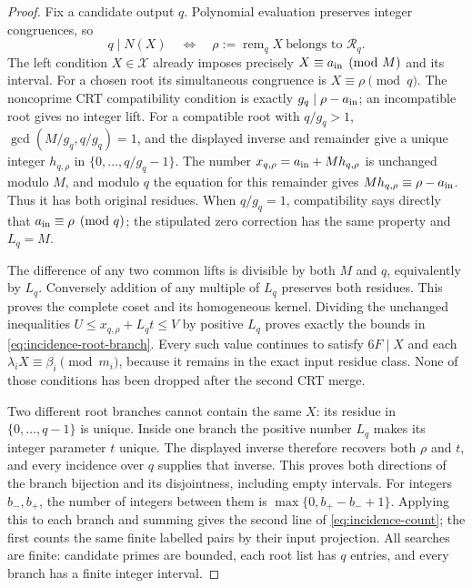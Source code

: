\begin{proof}
Fix a candidate output \(q\).  Polynomial evaluation preserves
integer congruences, so
\[
 q\mid N(X)\quad\Longleftrightarrow\quad
 \rho:=\operatorname{rem}_q X\ \text{belongs to }\mathcal R_q.
\]
The left condition \(X\in\mathcal X\) already imposes precisely
\(X\equiv a_{\rm in}\pmod M\) and its interval.
For a chosen root its simultaneous congruence is
\(X\equiv\rho\pmod q\).
The noncoprime CRT compatibility condition is exactly
\(g_q\mid\rho-a_{\rm in}\); an incompatible root gives no
integer lift.  For a compatible root with \(q/g_q>1\),
\(\gcd(M/g_q,q/g_q)=1\), and the displayed inverse and remainder
give a unique integer \(h_{q,\rho}\) in
\(\{0,\ldots,q/g_q-1\}\).
The number \(x_{q,\rho}=a_{\rm in}+Mh_{q,\rho}\) is unchanged
modulo \(M\), and modulo \(q\) the equation for this remainder
gives \(Mh_{q,\rho}\equiv\rho-a_{\rm in}\).
Thus it has both original residues.
When \(q/g_q=1\), compatibility says directly that
\(a_{\rm in}\equiv\rho\pmod q\); the stipulated zero correction
has the same property and \(L_q=M\).

The difference of any two common lifts is divisible by both
\(M\) and \(q\), equivalently by \(L_q\).
Conversely addition of any multiple of \(L_q\) preserves both
residues.  This proves the complete coset and its homogeneous
kernel.  Dividing the unchanged inequalities
\(U\le x_{q,\rho}+L_qt\le V\) by positive \(L_q\) proves
exactly the bounds in \eqref{eq:incidence-root-branch}.
Every such value continues to satisfy \(6F\mid X\) and each
\(\lambda_iX\equiv\beta_i\pmod{m_i}\), because it remains in
the exact input residue class.  None of those conditions has been
dropped after the second CRT merge.

Two different root branches cannot contain the same \(X\):
its residue in \(\{0,\ldots,q-1\}\) is unique.
Inside one branch the positive number \(L_q\) makes its
integer parameter \(t\) unique.  The displayed inverse therefore
recovers both \(\rho\) and \(t\), and every incidence over \(q\)
supplies that inverse.  This proves both directions of the
branch bijection and its disjointness, including empty intervals.
For integers \(b_-,b_+\), the number of integers between them is
\(\max\{0,b_+-b_-+1\}\).  Applying this to each branch and
summing gives the second line of \eqref{eq:incidence-count};
the first counts the same finite labelled pairs by their input
projection.  All searches are finite: candidate primes are
bounded, each root list has \(q\) entries, and every branch
has a finite integer interval.


\end{proof}
